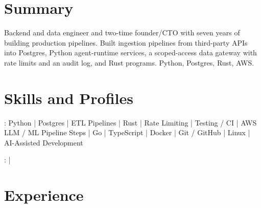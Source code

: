 \documentclass[print]{jack-resume}
\begin{document}
\pagecolor{darkmodeBackground}


\begin{minipage}[t][1cm][t]{.03\textwidth}
    \hfill
\end{minipage}

\section{Summary}
Backend and data engineer and two-time founder/CTO with seven years of building production pipelines. Built ingestion pipelines from third-party APIs into Postgres, Python agent-runtime services, a scoped-access data gateway with rate limits and an audit log, and Rust programs. Python, Postgres, Rust, AWS.
\sectionsep

\section{Skills and Profiles}
:
Python \hfill | \hfill
Postgres \hfill | \hfill
ETL Pipelines \hfill | \hfill
Rust \hfill | \hfill
Rate Limiting \hfill | \hfill
Testing / CI \hfill | \hfill
AWS \\
\hspace{1.0cm} LLM / ML Pipeline Steps \hfill | \hfill
Go \hfill | \hfill
TypeScript \hfill | \hfill
Docker \hfill | \hfill
Git / GitHub \hfill | \hfill
Linux \hfill | \hfill
AI-Assisted Development \\

\raggedright{
    :
      \href{https://www.linkedin.com/in/jack-sturtevant/}{ \ExternalLink} |
     \href{https://github.com/jacksturt}{ \ExternalLink}}

\section{Experience}
\end{document}
